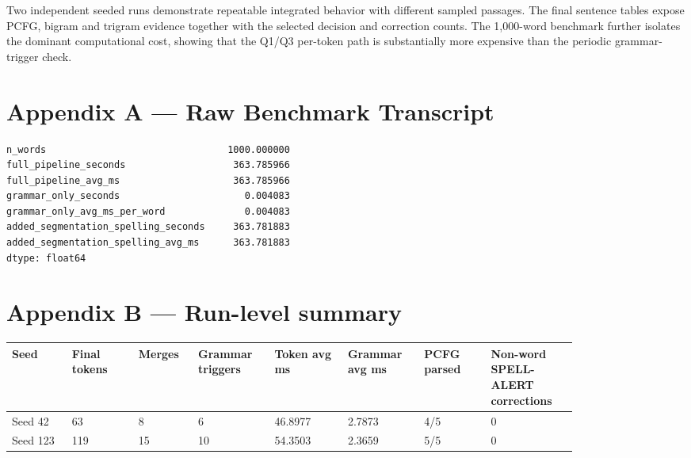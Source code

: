 \documentclass[11pt]{article}
\begin{document}
Two independent seeded runs demonstrate repeatable integrated behavior with different sampled passages. The final sentence tables expose PCFG, bigram and trigram evidence together with the selected decision and correction counts. The 1,000-word benchmark further isolates the dominant computational cost, showing that the Q1/Q3 per-token path is substantially more expensive than the periodic grammar-trigger check.

\appendix
\section*{Appendix A --- Raw Benchmark Transcript}

\begin{lstlisting}
n_words                                1000.000000
full_pipeline_seconds                   363.785966
full_pipeline_avg_ms                    363.785966
grammar_only_seconds                      0.004083
grammar_only_avg_ms_per_word              0.004083
added_segmentation_spelling_seconds     363.781883
added_segmentation_spelling_avg_ms      363.781883
dtype: float64
\end{lstlisting}

\section*{Appendix B --- Run-level summary}

\begin{longtable}{@{}p{0.09\linewidth}p{0.10\linewidth}p{0.08\linewidth}p{0.11\linewidth}p{0.11\linewidth}p{0.11\linewidth}p{0.10\linewidth}p{0.13\linewidth}@{}}
\toprule
\textbf{Seed} & \textbf{Final tokens} & \textbf{Merges} & \textbf{Grammar triggers} & \textbf{Token avg ms} & \textbf{Grammar avg ms} & \textbf{PCFG parsed} & \textbf{Non-word SPELL-ALERT corrections} \\
\midrule
\endhead
Seed 42 & 63 & 8 & 6 & 46.8977 & 2.7873 & 4/5 & 0 \\
Seed 123 & 119 & 15 & 10 & 54.3503 & 2.3659 & 5/5 & 0 \\
\bottomrule
\end{longtable}
\end{document}
